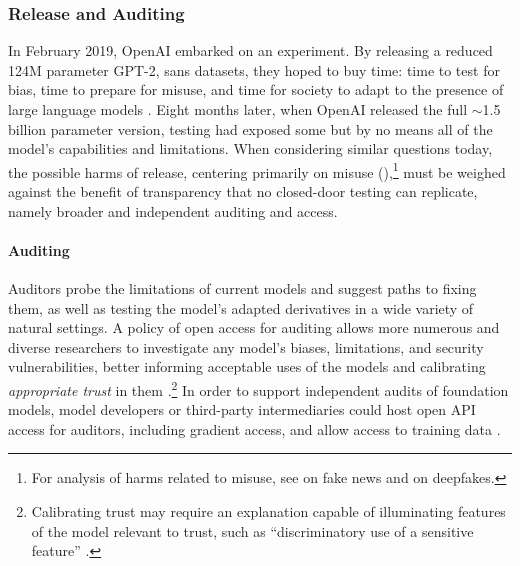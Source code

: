 \subsubsection{Release and Auditing}

In February 2019, OpenAI embarked on an experiment.  By releasing a reduced 124M parameter GPT-2, sans datasets, they hoped to buy time: time to test for bias, time to prepare for misuse, and time for society to adapt to the presence of large language models \citep{solaiman_release_2019}. Eight months later, when OpenAI released the full $\sim$1.5 billion parameter version, testing had exposed some but by no means all of the model’s capabilities and limitations. 
When considering similar questions today, the possible harms of release, centering primarily on misuse (),\footnote{For analysis of harms related to misuse, see \citep{Rini2017-fakenews} on fake news and \citep{Rini2020deepfakes} on deepfakes.} must be weighed against the benefit of transparency that no closed-door testing can replicate, namely broader and independent auditing and access.  

\paragraph{Auditing}  
Auditors probe the limitations of current models and suggest paths to fixing them, as well as testing the model's adapted derivatives in a wide variety of natural settings. 
A policy of open access for auditing allows more numerous and diverse researchers to investigate any model’s biases, limitations, and security vulnerabilities, better informing acceptable uses of the models and calibrating \textit{appropriate trust} in them \citep{Danks2019, Baier1986}.\footnote{Calibrating trust may require an explanation capable of illuminating features of the model relevant to trust, such as ``discriminatory use of a sensitive feature'' \citep{dimanov2020you}.}  In order to support independent audits of foundation models, model developers or third-party intermediaries could host open API access for auditors, including gradient access, and allow access to training data \citep{raji2019, Raji2020}. 

